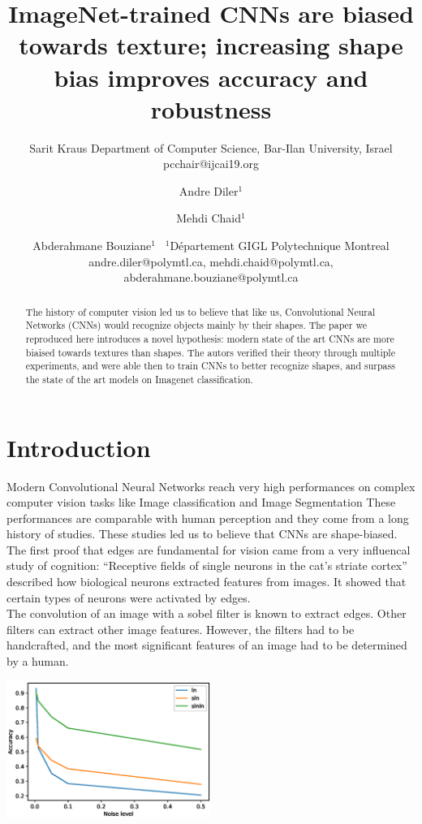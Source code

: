 \documentclass{article}
\title{ImageNet-trained CNNs are biased towards texture; increasing shape bias improves accuracy and robustness}
\author{
    Sarit Kraus
    \affiliations
    Department of Computer Science, Bar-Ilan University, Israel \emails
    pcchair@ijcai19.org
}
\author{
Andre Diler$^1$
\and
Mehdi Chaid$^1$\and
Abderahmane Bouziane$^1$\
\affiliations
$^1$Département GIGL Polytechnique Montreal\\
\emails
andre.diler@polymtl.ca,
mehdi.chaid@polymtl.ca,
abderahmane.bouziane@polymtl.ca
}
\begin{document}
\maketitle

\begin{abstract}
The history of computer vision led us to believe that like us, Convolutional Neural Networks (CNNs) would recognize 
objects mainly by their shapes. The paper we reproduced here introduces a novel hypothesis:
modern state of the art CNNs are more biaised towards textures than shapes. 
The autors verified their theory through multiple experiments,
and were able then to train CNNs to better recognize shapes, and surpass the state of the art models on Imagenet classification.
\end{abstract}

\section{Introduction}


Modern Convolutional Neural Networks reach very high performances on complex computer vision tasks like
Image classification and Image Segmentation
These performances are comparable with human perception and they come from a long history of studies.
These studies led us to believe that CNNs are shape-biased. \\  
\noindent
The first proof that edges are fundamental for vision came from a very influencal study of cognition:
  “Receptive fields of single neurons in the cat’s striate cortex”
described how biological neurons extracted features from images. 
It showed that certain types of neurons were activated by edges. \\
\noindent
The convolution of an image with a sobel filter is known to extract edges.
Other filters can extract other image features. However, the filters had to be handcrafted, and
the most significant features of an image had to be determined by a human.

\includegraphics[width = 0.5\textwidth]{imgs/uniform}
\end{document}
